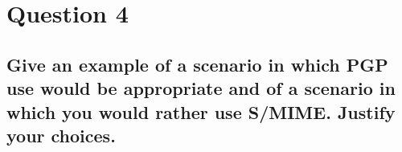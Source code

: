 \documentclass{report}
\begin{document}
	\section{Question 4}
	\startsection
		\renewcommand{\thesubsection}{\thesection.\Alph{subsection}}
		\subsection{Give an example of a scenario in which PGP use would be appropriate and of a scenario in which you would rather use S/MIME. Justify your choices.}
		\startsubsection
		\closesection
	\closesection
\end{document}

